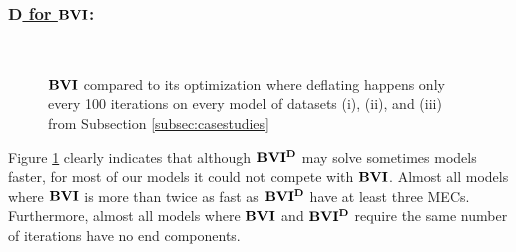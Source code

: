 \subsubsection*{\underline{$\mathbf{D}$ for $\mathbf{BVI}$}:}
\begin{figure}[h!]
    \centering
    \
    \caption{$\mathbf{BVI}$ compared to its optimization where deflating happens only every 100 iterations on every model of datasets (i), (ii), and (iii) from Subsection \ref{subsec:casestudies}}%
    \label{fig:Scatter_D}%
    \end{figure}
Figure \ref{fig:Scatter_D} clearly indicates that although $\mathbf{BVI^D}$ may solve sometimes models faster, 
for most of our models it could not compete with $\mathbf{BVI}$. 
Almost all models where $\mathbf{BVI}$ is more than twice as fast as $\mathbf{BVI^D}$ have at least three MECs.
Furthermore, almost all models where $\mathbf{BVI}$ and $\mathbf{BVI^D}$ require the same number of iterations have no end components.

